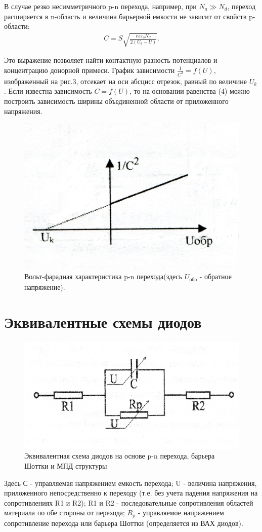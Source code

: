 В случае резко несимметричного p-n перехода, например, при $N_a \gg N_d$, переход расширяется в n-область и величина барьерной емкости не зависит от свойств p-области:
\begin{gather}
	C=S\sqrt{\frac{e\varepsilon \varepsilon_oN_d}{2(U_k-U)}}.
\end{gather}

Это выражение позволяет найти контактную разность потенциалов и концентрацию донорной примеси. График зависимости $\frac{1}{C^2}=f(U)$, изображенный на рис.3, отсекает на оси абсцисс отрезок, равный по величине $U_k$. Если известна зависимость $C=f(U)$, то на основании равенства (4) можно построить зависимость ширины объединенной области от приложенного напряжения.
\begin{figure}[h!]
	\centering
	\includegraphics[width=0.5\linewidth]{fig/fig3.jpg}
	\caption{Вольт-фарадная характеристика p-n перехода(здесь $U_{\text{обр}}$ - обратное напряжение).}
	\label{fig:3}
\end{figure}

\section{Эквивалентные схемы диодов}
\begin{figure}[h!]
	\centering
	\includegraphics[width=0.5\linewidth]{fig/fig4.jpg}
	\caption{Эквивалентная схема диодов на основе p-n перехода, барьера Шоттки и МПД структуры}
	\label{fig:4}
\end{figure}

Здесь С - управляемая напряжением емкость перехода; U - величина напряжения, приложенного непосредственно к переходу (т.е. без учета падения напряжения на сопротивлениях R1 и R2); R1 и R2 - последовательные сопротивления областей материала по обе стороны от перехода; $R_p$ - управляемое напряжением сопротивление перехода или барьера Шоттки (определяется из ВАХ диодов).

